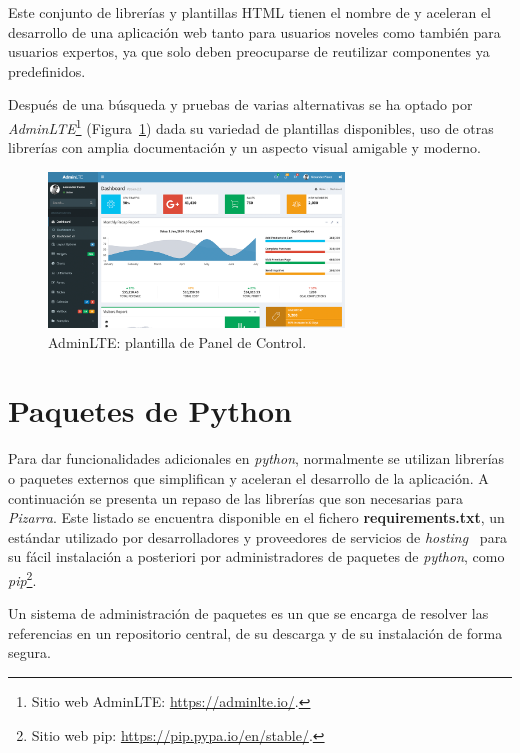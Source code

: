 \documentclass[11pt,spanish,listoffigures,listoftables]{tfgetsinf}
\begin{document}
Este conjunto de librerías y plantillas HTML tienen el nombre de  y aceleran el desarrollo de una aplicación web tanto para usuarios noveles como también para usuarios expertos, ya que solo deben preocuparse de reutilizar componentes ya predefinidos.

Después de una búsqueda y pruebas de varias alternativas se ha optado por \textit{AdminLTE}\footnote{Sitio web AdminLTE: \url{https://adminlte.io/}.} (Figura~\ref{figura:admin-lte}) dada su variedad de plantillas disponibles, uso de otras librerías con amplia documentación y un aspecto visual amigable y moderno.

\begin{figure}[!ht]
	\centering
	\includegraphics[width=0.70\textwidth]{img/admin-lte}
    \caption[AdminLTE: plantilla de Panel de Control ]{AdminLTE: plantilla de Panel de Control.}
	\label{figura:admin-lte}
\end{figure}

\section{Paquetes de Python}

Para dar funcionalidades adicionales en \textit{python}, normalmente se utilizan librerías o \Gls{paquete}s externos que simplifican y aceleran el desarrollo de la aplicación. A continuación se presenta un repaso de las librerías que son necesarias para \textit{Pizarra}. Este listado se encuentra disponible en el fichero \textbf{requirements.txt}, un estándar utilizado por desarrolladores y proveedores de servicios de \textit{hosting}~\cite{book-developing-web-python} para su fácil instalación a posteriori por administradores de paquetes de \textit{python}, como \textit{pip}\footnote{Sitio web pip: \url{https://pip.pypa.io/en/stable/}.}.

Un sistema de administración de paquetes es un  que se encarga de resolver las referencias en un repositorio central, de su descarga y de su instalación de forma segura.
\end{document}
